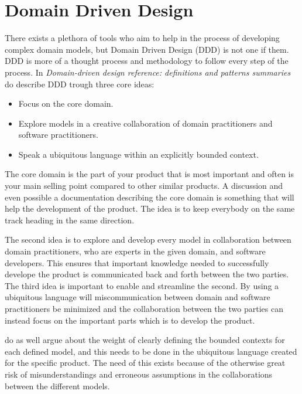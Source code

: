 \section{Domain Driven Design}
There exists a plethora of tools who aim to help in the process of developing complex domain models, but Domain Driven Design (DDD) is not one if them. \parencite{Bankes, 10.1007/978-3-319-24309-2_33} DDD is more of a thought process and methodology to follow every step of the process. \parencite{EvansEric2004Dd:t} In \emph{Domain-driven design reference: definitions and patterns summaries} do \textcite{evans_2015} describe DDD trough three core ideas:

\begin{itemize}
  \item Focus on the core domain.
  \item Explore models in a creative collaboration of domain practitioners and software practitioners.
  \item Speak a ubiquitous language within an explicitly bounded context.
\end{itemize}

The core domain is the part of your product that is most important and often is your main selling point compared to other similar products. \parencite{millett_2015} A discussion and even possible a documentation describing the core domain is something that will help the development of the product. The idea is to keep everybody on the same track heading in the same direction. \parencite{EvansEric2004Dd:t}

The second idea is to explore and develop every model in collaboration between domain practitioners, who are experts in the given domain, and software developers. This ensures that important knowledge needed to successfully develope the product is communicated back and forth between the two parties. \parencite{millett_2015} The third idea is important to enable and streamline the second. By using a ubiquitous language will miscommunication between domain and software practitioners be minimized and the collaboration between the two parties can instead focus on the important parts which is to develop the product. \parencite{evans_2015}

\textcite{evans_2015} do as well argue about the weight of clearly defining the bounded contexts for each defined model, and this needs to be done in the ubiquitous language created for the specific product. The need of this exists because of the otherwise great risk of misunderstandings and erroneous assumptions in the collaborations between the different models. \parencite{millett_2015}


